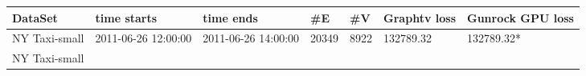 \documentclass[10pt,oneside]{memoir}
\begin{document}
\begin{longtable}[]{@{}lllllll@{}}
\toprule
\begin{minipage}[b]{0.10\columnwidth}\raggedright
DataSet\strut
\end{minipage} & \begin{minipage}[b]{0.15\columnwidth}\raggedright
time starts\strut
\end{minipage} & \begin{minipage}[b]{0.14\columnwidth}\raggedright
time ends\strut
\end{minipage} & \begin{minipage}[b]{0.07\columnwidth}\raggedright
\#E\strut
\end{minipage} & \begin{minipage}[b]{0.07\columnwidth}\raggedright
\#V\strut
\end{minipage} & \begin{minipage}[b]{0.14\columnwidth}\raggedright
Graphtv loss\strut
\end{minipage} & \begin{minipage}[b]{0.14\columnwidth}\raggedright
Gunrock GPU loss\strut
\end{minipage}\tabularnewline
\midrule
\endhead
\begin{minipage}[t]{0.10\columnwidth}\raggedright
NY Taxi-small\strut
\end{minipage} & \begin{minipage}[t]{0.15\columnwidth}\raggedright
2011-06-26 12:00:00\strut
\end{minipage} & \begin{minipage}[t]{0.14\columnwidth}\raggedright
2011-06-26 14:00:00\strut
\end{minipage} & \begin{minipage}[t]{0.07\columnwidth}\raggedright
20349\strut
\end{minipage} & \begin{minipage}[t]{0.07\columnwidth}\raggedright
8922\strut
\end{minipage} & \begin{minipage}[t]{0.14\columnwidth}\raggedright
132789.32\strut
\end{minipage} & \begin{minipage}[t]{0.14\columnwidth}\raggedright
132789.32*\strut
\end{minipage}\tabularnewline
\begin{minipage}[t]{0.10\columnwidth}\raggedright
NY Taxi-small\strut
\end{minipage} & \begin{minipage}[t]{0.15\columnwidth}\raggedright

\end{minipage}
\end{longtable}
\end{document}
